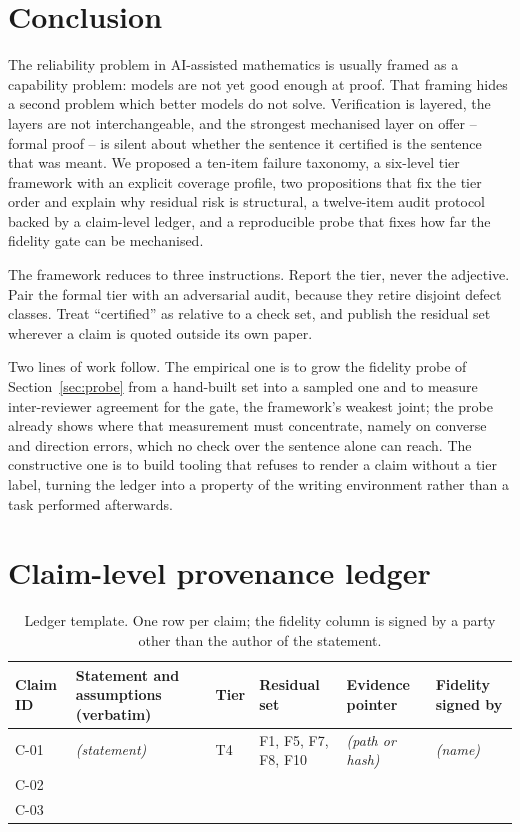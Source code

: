 \documentclass[11pt]{article}
\theoremstyle{plain}
\theoremstyle{definition}
\begin{document}
\section{Conclusion}

The reliability problem in AI-assisted mathematics is usually framed as a capability problem:
models are not yet good enough at proof. That framing hides a second problem which better models
do not solve. Verification is layered, the layers are not interchangeable, and the strongest
mechanised layer on offer -- formal proof -- is silent about whether the sentence it certified is
the sentence that was meant. We proposed a ten-item failure taxonomy, a six-level tier framework
with an explicit coverage profile, two propositions that fix the tier order and explain why
residual risk is structural, a twelve-item audit protocol backed by a claim-level ledger, and a
reproducible probe that fixes how far the fidelity gate can be mechanised.

The framework reduces to three instructions. Report the tier, never the adjective. Pair the formal
tier with an adversarial audit, because they retire disjoint defect classes. Treat ``certified''
as relative to a check set, and publish the residual set wherever a claim is quoted outside its own
paper.

Two lines of work follow. The empirical one is to grow the fidelity probe of
Section~\ref{sec:probe} from a hand-built set into a sampled one and to measure inter-reviewer
agreement for the gate, the framework's weakest joint; the probe already shows where that
measurement must concentrate, namely on converse and direction errors, which no check over the
sentence alone can reach. The constructive one is to build tooling that refuses to render a claim
without a tier label, turning the ledger into a property of the writing environment rather than a
task performed afterwards.




\appendix
\section{Claim-level provenance ledger}
\label{app:ledger}

\begin{table}[h]
\centering
\small
\caption{Ledger template. One row per claim; the fidelity column is signed by a party other than
the author of the statement.}
\begin{tabular}{@{}p{1.3cm}p{3.6cm}p{2.6cm}p{1.4cm}p{2.4cm}p{2.0cm}@{}}
\toprule
Claim ID & Statement and assumptions (verbatim) & Tier & Residual set & Evidence pointer
& Fidelity signed by \\
\midrule
C-01 & \textit{(statement)} & T4 & F1, F5, F7, F8, F10 & \textit{(path or hash)} & \textit{(name)} \\
C-02 & & & & & \\
C-03 & & & & & \\
\bottomrule
\end{tabular}
\end{table}
\end{document}
